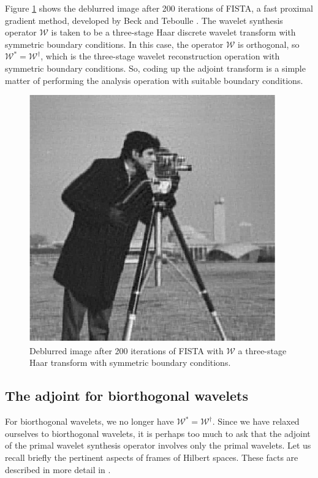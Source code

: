 \documentclass[journal]{IEEEtran}
\begin{document}
Figure \ref{fig:cameraman_200_db1_sym} shows the deblurred image after 200 iterations of FISTA, a fast proximal gradient method, developed by Beck and Teboulle \cite{beck_2009}.  The wavelet synthesis operator $\mathcal{W}$ is taken to be a three-stage Haar discrete wavelet transform with symmetric boundary conditions.  In this case, the operator $\mathcal{W}$ is orthogonal, so $\mathcal{W}^\ast = \mathcal{W}^\dagger$, which is the three-stage wavelet reconstruction operation with symmetric boundary conditions.  So, coding up the adjoint transform is a simple matter of performing the analysis operation with suitable boundary conditions.

\begin{figure}
   \centering
   \includegraphics[width=0.8\columnwidth]{figures/cameraman_rec_200_db1_sym_trim.pdf}
   \caption{Deblurred image after 200 iterations of FISTA with $\mathcal{W}$ a three-stage Haar transform with symmetric boundary conditions.}
   \label{fig:cameraman_200_db1_sym}
\end{figure}


\subsection{The adjoint for biorthogonal wavelets}
For biorthogonal wavelets, we no longer have $\mathcal{W}^\ast=\mathcal{W}^\dagger$.  Since we have relaxed ourselves to biorthogonal wavelets, it is perhaps too much to ask that the adjoint of the primal wavelet synthesis operator involves only the primal wavelets.  Let us recall briefly the pertinent aspects of frames of Hilbert spaces.  These facts are described in more detail in \cite{mallat_2009}.\\
\end{document}
